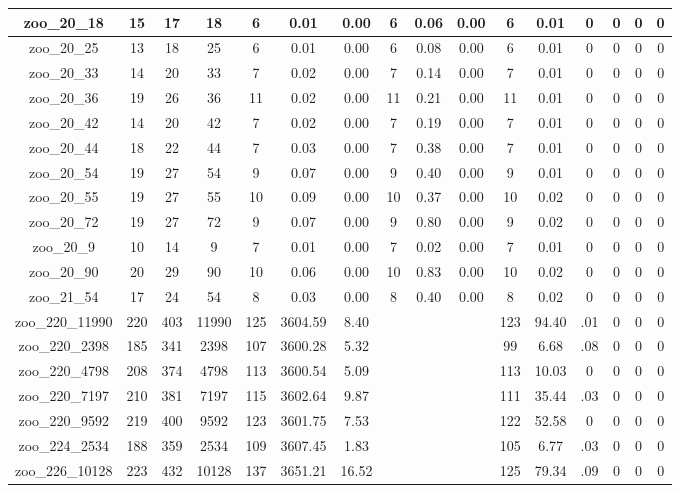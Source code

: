 \begin{landscape}
\begin{longtable}{|c|c|c|c|c|c|c|c|c|c|c|c|c|c|c|c|}
zoo\_20\_18 & 15 & 17 & 18 & 6 & 0.01 & 0.00 & 6 & 0.06 & 0.00 & 6 & 0.01 & 0 & 0 & 0 & 0 \\ \hline 
zoo\_20\_25 & 13 & 18 & 25 & 6 & 0.01 & 0.00 & 6 & 0.08 & 0.00 & 6 & 0.01 & 0 & 0 & 0 & 0 \\ \hline 
zoo\_20\_33 & 14 & 20 & 33 & 7 & 0.02 & 0.00 & 7 & 0.14 & 0.00 & 7 & 0.01 & 0 & 0 & 0 & 0 \\ \hline 
zoo\_20\_36 & 19 & 26 & 36 & 11 & 0.02 & 0.00 & 11 & 0.21 & 0.00 & 11 & 0.01 & 0 & 0 & 0 & 0 \\ \hline 
zoo\_20\_42 & 14 & 20 & 42 & 7 & 0.02 & 0.00 & 7 & 0.19 & 0.00 & 7 & 0.01 & 0 & 0 & 0 & 0 \\ \hline 
zoo\_20\_44 & 18 & 22 & 44 & 7 & 0.03 & 0.00 & 7 & 0.38 & 0.00 & 7 & 0.01 & 0 & 0 & 0 & 0 \\ \hline 
zoo\_20\_54 & 19 & 27 & 54 & 9 & 0.07 & 0.00 & 9 & 0.40 & 0.00 & 9 & 0.01 & 0 & 0 & 0 & 0 \\ \hline 
zoo\_20\_55 & 19 & 27 & 55 & 10 & 0.09 & 0.00 & 10 & 0.37 & 0.00 & 10 & 0.02 & 0 & 0 & 0 & 0 \\ \hline 
zoo\_20\_72 & 19 & 27 & 72 & 9 & 0.07 & 0.00 & 9 & 0.80 & 0.00 & 9 & 0.02 & 0 & 0 & 0 & 0 \\ \hline 
zoo\_20\_9 & 10 & 14 & 9 & 7 & 0.01 & 0.00 & 7 & 0.02 & 0.00 & 7 & 0.01 & 0 & 0 & 0 & 0 \\ \hline 
zoo\_20\_90 & 20 & 29 & 90 & 10 & 0.06 & 0.00 & 10 & 0.83 & 0.00 & 10 & 0.02 & 0 & 0 & 0 & 0 \\ \hline 
zoo\_21\_54 & 17 & 24 & 54 & 8 & 0.03 & 0.00 & 8 & 0.40 & 0.00 & 8 & 0.02 & 0 & 0 & 0 & 0 \\ \hline 
zoo\_220\_11990 & 220 & 403 & 11990 & 125 & 3604.59 & 8.40 &  &  &  & 123 & 94.40 & .01 & 0 & 0 & 0 \\ \hline 
zoo\_220\_2398 & 185 & 341 & 2398 & 107 & 3600.28 & 5.32 &  &  &  & 99 & 6.68 & .08 & 0 & 0 & 0 \\ \hline 
zoo\_220\_4798 & 208 & 374 & 4798 & 113 & 3600.54 & 5.09 &  &  &  & 113 & 10.03 & 0 & 0 & 0 & 0 \\ \hline 
zoo\_220\_7197 & 210 & 381 & 7197 & 115 & 3602.64 & 9.87 &  &  &  & 111 & 35.44 & .03 & 0 & 0 & 0 \\ \hline 
zoo\_220\_9592 & 219 & 400 & 9592 & 123 & 3601.75 & 7.53 &  &  &  & 122 & 52.58 & 0 & 0 & 0 & 0 \\ \hline 
zoo\_224\_2534 & 188 & 359 & 2534 & 109 & 3607.45 & 1.83 &  &  &  & 105 & 6.77 & .03 & 0 & 0 & 0 \\ \hline 
zoo\_226\_10128 & 223 & 432 & 10128 & 137 & 3651.21 & 16.52 &  &  &  & 125 & 79.34 & .09 & 0 & 0 & 0 \\ \hline 

\end{longtable}
\end{landscape}
